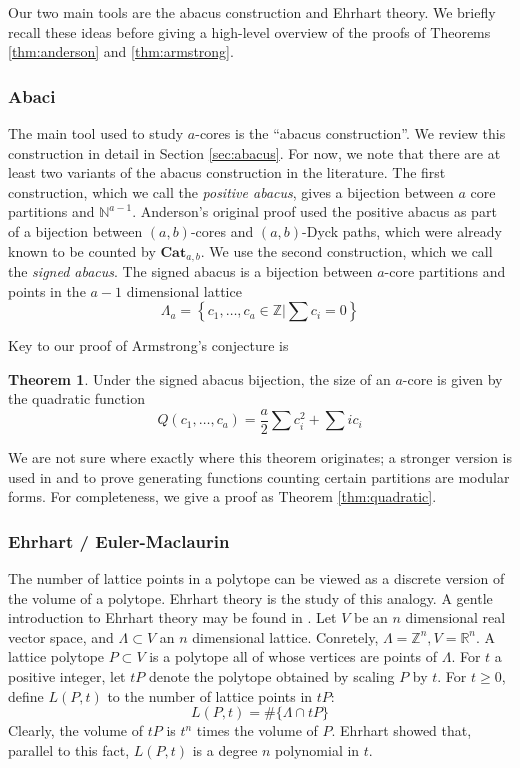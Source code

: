 \documentclass{amsart}[12pt]
\theoremstyle{definition}
\newtheorem*{theorem*}{Theorem}
\newcommand{\Z}{\mathbb{Z}}
\newcommand{\N}{\mathbb{N}}
\newcommand{\R}{\mathbb{R}}
\newcommand{\Cat}{\mathbf{Cat}}
\begin{document}
Our two main tools are the abacus construction and Ehrhart theory. We briefly recall these ideas before giving a high-level overview of the proofs of Theorems \ref{thm:anderson} and \ref{thm:armstrong}.







\subsubsection{Abaci}
The main tool used to study $a$-cores is the ``abacus construction''. We review this construction in detail in Section \ref{sec:abacus}. For now, we note that there are at least two variants of the abacus construction in the literature.
The first construction, which we call the \emph{positive abacus}, gives a bijection between $a$ core partitions and $\N^{a-1}$. Anderson's original proof used the positive abacus as part of a bijection between $(a,b)$-cores and $(a,b)$-Dyck paths, which were already known to be counted by $\Cat_{a,b}$.
We use the second construction, which we call the \emph{signed abacus}. The signed abacus is a bijection between $a$-core partitions and points in the $a-1$ dimensional lattice
$$\Lambda_a=\left\{c_1,\dots,c_a\in\Z\Big |\sum c_i=0\right\}$$

Key to our proof of Armstrong's conjecture is 


\begin{theorem*}
Under the signed abacus bijection, the size of an $a$-core is given by the quadratic function
$$Q(c_1,\dots, c_a)=\frac{a}{2}\sum c_i^2+\sum ic_i$$
\end{theorem*}

We are not sure where exactly where this theorem originates; a stronger version is used in \cite{GKS} and \cite{DS} to prove generating functions counting certain partitions are modular forms.   For completeness, we give a proof as Theorem \ref{thm:quadratic}.





\subsubsection{Ehrhart / Euler-Maclaurin}
The number of lattice points in a polytope can be viewed as a discrete version of the volume of a polytope. Ehrhart theory is the study of this analogy. A gentle introduction to Ehrhart theory may be found in \cite{BR}.
Let $V$ be an $n$ dimensional real vector space, and $\Lambda\subset V$ an $n$ dimensional lattice. Conretely, $\Lambda=\Z^n, V=\R^n$. A lattice polytope $P\subset V$ is a polytope all of whose vertices are points of $\Lambda$.
For $t$ a positive integer, let $tP$ denote the polytope obtained by scaling $P$ by $t$. For $t\geq 0$, define $L(P,t)$ to the number of lattice points in $tP$:
$$L(P,t)=\#\{\Lambda\cap tP\}$$
Clearly, the volume of $tP$ is $t^n$ times the volume of $P$. Ehrhart showed that, parallel to this fact, $L(P,t)$ is a degree $n$ polynomial in $t$. 
\end{document}

